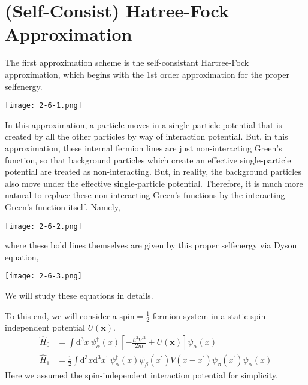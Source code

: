 \section{(Self-Consist) Hatree-Fock Approximation}%

The first approximation scheme is the self-consistant Hartree-Fock approximation, which begins with the 1st order approximation for the proper selfenergy.
\begin{center}
\texttt{[image: 2-6-1.png]}\label{Fig2.6.1}
\end{center}


In this approximation, a particle moves in a single particle potential that is created by all the other particles by way of interaction potential. But, in this approximation, these internal fermion lines are just non-interacting Green's function, so that background particles which create an effective single-particle potential are treated as non-interacting. But, in reality, the background particles also move under the effective single-particle potential. Therefore, it is much more natural to replace these non-interacting Green's functions by the interacting Green's function itself. Namely,
\begin{center} \texttt{[image: 2-6-2.png]} \label{Fig2.6.2}\end{center}
where these bold lines themselves are given by this proper selfenergy via Dyson equation,
\begin{center} \texttt{[image: 2-6-3.png]}\label{Fig2.6.3} \end{center}
We will study these equations in details.

To this end, we will consider a spin$=\frac{1}{2}$ fermion system in a static spin-independent potential $U(\mathbf{x})$.
\[\begin{split}
\hat{H}_{0} &= \int \mathrm{d}^{3}x \  \psi_{\alpha}^{\dagger}(x)\left[ -\frac{\hbar^{2}\nabla^{2}}{2m} + U(\mathbf{x}) \right] \psi_{\alpha}(x) \\
\hat{H}_{1} &= \frac{1}{2} \int \mathrm{d}^{3}x \mathrm{d}^{3}x^{'} \ \psi_{\alpha}^{\dagger}(x) \psi_{\beta}^{\dagger}(x^{'})V(x-x^{'})\psi_{\beta}(x^{'})\psi_{\alpha}(x)
\end{split}\]
Here we assumed the spin-independent interaction potential for simplicity.

